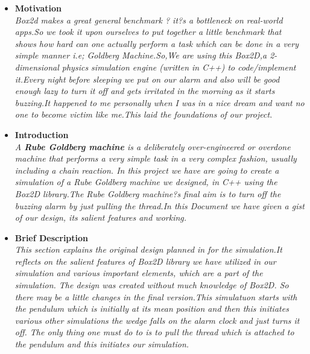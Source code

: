 \documentclass[a4paper]{article}
\begin{document}
	
	\begin{flushleft}
	\begin{itemize}
	\item{\LARGE \textbf{Motivation}}\\
	\vspace{2mm}
	\large\textit{
	Box2d makes a great general benchmark ? it?s a bottleneck on real-world apps.So we took it upon ourselves to put together a little benchmark that shows how hard can one actually perform a task which can be done in a very simple manner i.e; Goldberg Machine.So,We are using this Box2D,a 2-dimensional physics simulation engine (written in C++) to code/implement it.Every night before sleeping we put on our alarm and also will be good enough lazy to turn it off and gets irritated in the morning  as it starts buzzing.It happened to me personally when I was in a nice dream and want no one to become victim like me.This laid the foundations of our project.}
	
	
	\vspace{4mm}
	\item{\LARGE \textbf{Introduction}}\\
	\vspace{2mm}
	\large\textit{
	A \textbf{Rube Goldberg machine} is a deliberately over-engineered or overdone machine that performs a very simple task in
	a very complex fashion, usually including a chain reaction. In this project we have are going to create a simulation of a Rube
	Goldberg machine we designed, in C++ using the Box2D library.The Rube Goldberg machine?s final aim is to turn off the buzzing alarm by just pulling the thread.In this Document we have given a gist of our design, its salient features and working.}
	
	\vspace{4mm}
	\item{\LARGE \textbf{Brief Description}}\\
	\vspace{2mm}
	\large\textit{
	This section explains the original design planned in for the simulation.It reflects on the salient features of Box2D library we have utilized in our simulation and various important elements, which are a part of the simulation. The design was created without much knowledge of Box2D. So there may be a little changes in the final version.This simulatuon starts with the pendulum which is initially at its mean position and then this initiates various other simulations the wedge falls on the alarm clock and just turns it off. The only thing one must do to is to pull the thread which is attached to the pendulum and this initiates our  simulation. }
	\end{itemize}
	\end{flushleft}
	
\end{document}
